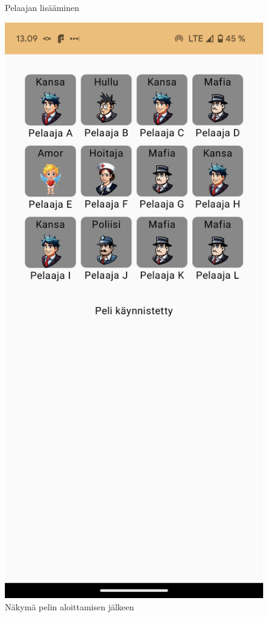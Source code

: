 \begin{figure}[h!]
\begin{minipage}[t]{.3\textwidth}
            \caption{Pelaajan lisääminen}
            \label{fig:screenshot-add-player}
      \end{minipage}
      \begin{minipage}[t]{.3\textwidth}
            \includegraphics[width=\textwidth]{figures/screenshot-game-started.png}
            \caption{Näkymä pelin aloittamisen jälkeen}
            \label{fig:screenshot-game-started}
      \end{minipage}
\end{figure}

